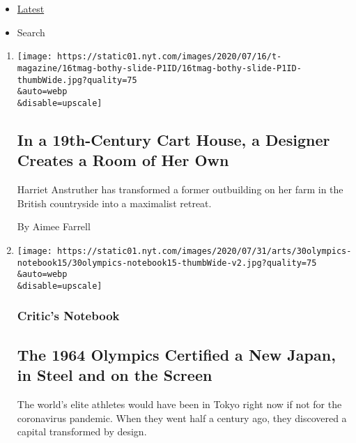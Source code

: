 \begin{itemize}
\tightlist
\item
  \protect\hyperlink{stream-panel}{Latest}
\item
  Search
\end{itemize}

\begin{enumerate}
\def\labelenumi{\arabic{enumi}.}
\item
  \href{/2020/07/31/t-magazine/design-bothy-anstruther.html}{}

  \texttt{[image: https://static01.nyt.com/images/2020/07/16/t-magazine/16tmag-bothy-slide-P1ID/16tmag-bothy-slide-P1ID-thumbWide.jpg?quality=75\\\&auto=webp\\\&disable=upscale]}

  \hypertarget{in-a-19th-century-cart-house-a-designer-creates-a-room-of-her-own}{%
  \subsection{In a 19th-Century Cart House, a Designer Creates a Room of
  Her
  Own}\label{in-a-19th-century-cart-house-a-designer-creates-a-room-of-her-own}}

  Harriet Anstruther has transformed a former outbuilding on her farm in
  the British countryside into a maximalist retreat.

  By Aimee Farrell
\item
  \href{/2020/07/30/arts/design/tokyo-olympics-1964-design.html}{}

  \texttt{[image: https://static01.nyt.com/images/2020/07/31/arts/30olympics-notebook15/30olympics-notebook15-thumbWide-v2.jpg?quality=75\\\&auto=webp\\\&disable=upscale]}

  \hypertarget{critics-notebook}{%
  \subsubsection{Critic's Notebook}\label{critics-notebook}}

  \hypertarget{the-1964-olympics-certified-a-new-japan-in-steel-and-on-the-screen}{%
  \subsection{The 1964 Olympics Certified a New Japan, in Steel and on
  the
  Screen}\label{the-1964-olympics-certified-a-new-japan-in-steel-and-on-the-screen}}

  The world's elite athletes would have been in Tokyo right now if not
  for the coronavirus pandemic. When they went half a century ago, they
  discovered a capital transformed by design.


\end{enumerate}
